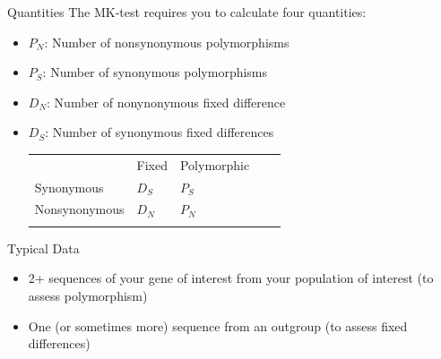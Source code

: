 \documentclass[compress]{beamer}
\begin{document}
\begin{frame}{Quantities}
The MK-test requires you to calculate four quantities:
\begin{itemize}
\item $P_N$: Number of nonsynonymous polymorphisms
\item $P_S$: Number of synonymous polymorphisms
\item $D_N$: Number of nonynonymous fixed difference
\item $D_S$: Number of synonymous fixed differences

\begin{table}[]
\begin{tabular}{lllll}
\cline{2-3}
\multicolumn{1}{l|}{}               & \multicolumn{1}{l|}{Fixed} & \multicolumn{1}{l|}{Polymorphic} &  &  \\ \cline{1-3}
\multicolumn{1}{|l|}{Synonymous}    & \multicolumn{1}{l|}{$D_S$}         & \multicolumn{1}{l|}{$P_S$}         &  &  \\ \cline{1-3}
\multicolumn{1}{|l|}{Nonsynonymous} & \multicolumn{1}{l|}{$D_N$}         & \multicolumn{1}{l|}{$P_N$}         &  &  \\ \cline{1-3}
                                    &                                    &                                    &  & 
\end{tabular}
\end{table}
\end{itemize}
\end{frame}

\begin{frame}{Typical Data}
\begin{itemize}
\item 2+ sequences of your gene of interest from your population of interest (to assess polymorphism)
\item One (or sometimes more) sequence from an outgroup (to assess fixed differences)
\end{itemize}
\end{frame}
\end{document}
